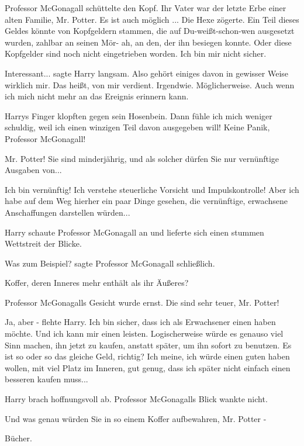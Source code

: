 Professor McGonagall schüttelte den Kopf. \glqq Ihr Vater war der letzte Erbe
einer alten Familie, Mr. Potter. Es ist auch möglich ...\grqq{} Die Hexe
zögerte. \glqq Ein Teil dieses Geldes könnte von Kopfgeldern stammen, die auf
Du-weißt-schon-wen ausgesetzt wurden, zahlbar an seinen Mör- ah, an den, der ihn
besiegen konnte. Oder diese Kopfgelder sind noch nicht eingetrieben worden. Ich
bin mir nicht sicher.\grqq{}

\glqq Interessant...\grqq{} sagte Harry langsam. \glqq Also gehört einiges davon
in gewisser Weise wirklich mir. Das heißt, von mir verdient. Irgendwie.
Möglicherweise. Auch wenn ich mich nicht mehr an das Ereignis erinnern
kann.\grqq{}

Harrys Finger klopften gegen sein Hosenbein. \glqq Dann fühle ich mich weniger
schuldig, weil ich einen winzigen Teil davon ausgegeben will! Keine Panik,
Professor McGonagall!\grqq{}

\glqq Mr. Potter! Sie sind minderjährig, und als solcher dürfen Sie nur
vernünftige Ausgaben von...\grqq{}

\glqq Ich bin vernünftig! Ich verstehe steuerliche Vorsicht und Impulskontrolle!
Aber ich habe auf dem Weg hierher ein paar Dinge gesehen, die vernünftige,
erwachsene Anschaffungen darstellen würden...\grqq{}

Harry schaute Professor McGonagall an und lieferte sich einen stummen Wettstreit
der Blicke.

\glqq Was zum Beispiel?\grqq{} sagte Professor McGonagall schließlich.

\glqq Koffer, deren Inneres mehr enthält als ihr Äußeres?\grqq{}

Professor McGonagalls Gesicht wurde ernst. \glqq Die sind sehr teuer, Mr.
Potter!\grqq{}

\glqq Ja, aber -\grqq{} flehte Harry. \glqq Ich bin sicher, dass ich als
Erwachsener einen haben möchte. Und ich kann mir einen leisten. Logischerweise
würde es genauso viel Sinn machen, ihn jetzt zu kaufen, anstatt später, um ihn
sofort zu benutzen. Es ist so oder so das gleiche Geld, richtig? Ich meine, ich
würde einen guten haben wollen, mit viel Platz im Inneren, gut genug, dass ich
später nicht einfach einen besseren kaufen muss...\grqq{}

Harry brach hoffnungsvoll ab. Professor McGonagalls Blick wankte nicht.

\glqq Und was genau würden Sie in so einem Koffer aufbewahren, Mr. Potter
-\grqq{}

\glqq Bücher.\grqq{}


